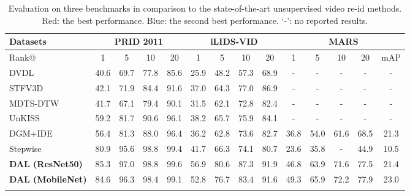 \documentclass{bmvc2k}
\begin{document}
\begin{table}[!t]
	\centering
	\footnotesize
	\setlength{\tabcolsep}{0.5em}
	\begin{tabular}{l|cccc|cccc|cccc|c}
		\hlineB{2}
		Datasets & \multicolumn{4}{c|}{PRID 2011} & \multicolumn{4}{c|}{iLIDS-VID} & \multicolumn{5}{c}{MARS} \\ \hline
		Rank@ & 1 & 5 & 10 & 20 & 1 & 5 & 10 & 20 & 1 & 5 & 10 & 20 & mAP \\ \hline\hline
		DVDL~\cite{karanam2015person} & 40.6 & 69.7 & 77.8 & 85.6  & 25.9 & 48.2 & 57.3 & 68.9 & - & - & - & - & - \\ 
		STFV3D~\cite{liu2015spatio} & 42.1 & 71.9 & 84.4 & 91.6 & 37.0 & 64.3 & 77.0 & 86.9 & - & - & - & - & -  \\
		MDTS-DTW~\cite{ma2017person} & 41.7 & 67.1 & 79.4 & 90.1 & 31.5 & 62.1 & 72.8 & 82.4 & - & - & - & - & - \\ 
		UnKISS~\cite{khan2016unsupervised} & 59.2 & 81.7 & 90.6 & 96.1 & 38.2 & 65.7 & 75.9 & 84.1 & - & - & - & - & - \\
		DGM+IDE~\cite{ye2017dynamic} & 56.4 & 81.3 & 88.0 & 96.4 & 36.2 & 62.8 & 73.6 & 82.7 & 36.8 & 54.0 & 61.6 & 68.5 & 21.3 \\
		Stepwise~\cite{liu2017stepwise} & 80.9 & 95.6 & {\color{red} 98.8} & {\color{blue} 99.4} & 41.7 & 66.3 & 74.1 & 80.7 & 23.6 & 35.8 & - & 44.9 & 10.5 \\
		\hline
		{\bf DAL (ResNet50)} &  
		{\color{red} 85.3} & {\color{red} 97.0} & {\color{red} 98.8} & {\color{red} 99.6} & 
		{\color{red} 56.9}  & {\color{red} 80.6}  & {\color{red} 87.3}  & {\color{red} 91.9}  & 
		{\color{blue} 46.8} & {\color{blue} 63.9} & {\color{blue} 71.6} & {\color{blue} 77.5} & {\color{blue} 21.4}
		\\
		{\bf DAL (MobileNet)} &  
{\color{blue} 84.6} & {\color{blue} 96.3} & {\color{blue} 98.4} & 99.1 & 
		{\color{blue} 52.8} & {\color{blue} 76.7} & {\color{blue} 83.4} & {\color{blue} 91.6} &
		{\color{red} 49.3} & {\color{red} 65.9} & {\color{red} 72.2} & {\color{red} 77.9} & {\color{red} 23.0} 
		\\
		\hlineB{2}
	\end{tabular}
	\vspace{1.0em}
	\caption{Evaluation on three benchmarks in comparison to the
          state-of-the-art unsupervised video re-id
          methods. {\color{red} Red}: the best
          performance. {\color{blue} Blue}: the second best
          performance. `-': no reported results.} 
	\vspace{-1.em}
	\label{tab:SOTA}
\end{table}
\end{document}
